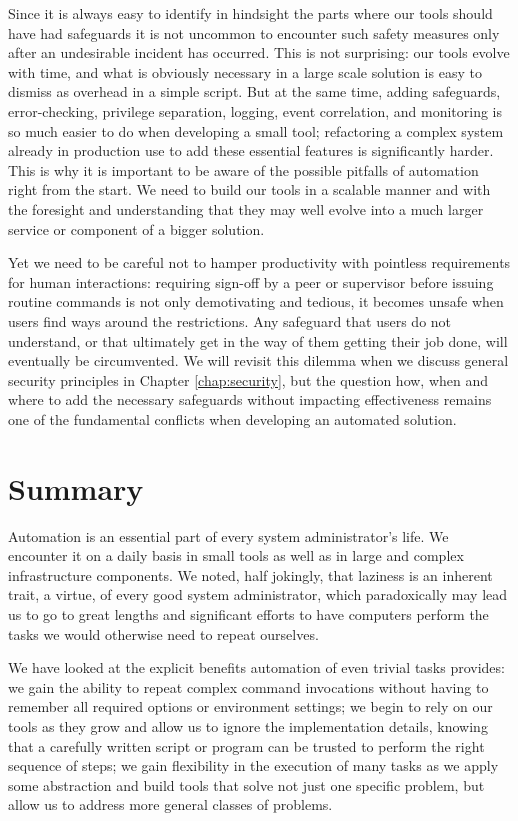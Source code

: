 Since it is always easy to identify in hindsight the
parts where our tools should have had safeguards it is
not uncommon to encounter such safety measures only
after an undesirable incident has occurred.  This is
not surprising: our tools evolve with time, and what
is obviously necessary in a large scale solution is
easy to dismiss as overhead in a simple script.  But
at the same time, adding safeguards, error-checking,
privilege separation, logging, event correlation, and
monitoring is so much easier to do when developing a
small tool; refactoring a complex system already in
production use to add these essential features is
significantly harder.  This is why it is important to
be aware of the possible pitfalls of automation right
from the start.  We need to build our tools in a
scalable manner and with the foresight and
understanding that they may well evolve into a much
larger service or component of a bigger solution.

Yet we need to be careful not to hamper productivity
with pointless requirements for human interactions:
requiring sign-off by a peer or supervisor before
issuing routine commands is not only demotivating and
tedious, it becomes unsafe when users find ways around
the restrictions.  Any safeguard that users do not
understand, or that ultimately get in the way of them
getting their job done, will eventually be
circumvented.  We will revisit this dilemma when we
discuss general security principles in Chapter
\ref{chap:security}, but the question how, when and
where to add the necessary safeguards without
impacting effectiveness remains one of the fundamental
conflicts when developing an automated solution.

\section{Summary}
\label{automation:summary}

Automation is an essential part of every system
administrator's life.  We encounter it on a daily
basis in small tools as well as in large and complex
infrastructure components.  We noted, half
jokingly, that laziness is an inherent trait, a
virtue, of every good system administrator, which
paradoxically may lead us to go to great lengths and
significant efforts to have computers perform the
tasks we would otherwise need to repeat ourselves.

We have looked at the explicit benefits automation of
even trivial tasks provides: we gain the ability to
repeat complex command invocations without having to
remember all required options or environment settings;
we begin to rely on our tools as they grow and allow
us to ignore the implementation details, knowing that
a carefully written script or program can be trusted
to perform the right sequence of steps;  we gain
flexibility in the execution of many tasks as we apply
some abstraction and build tools that solve not just
one specific problem, but allow us to address more
general classes of problems.

